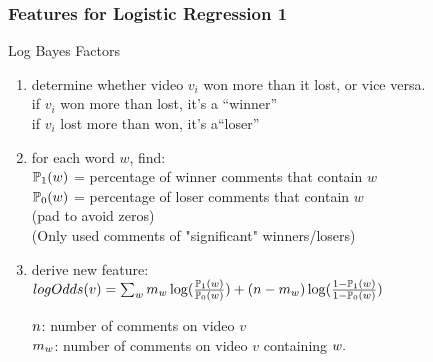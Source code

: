 \documentclass[fleqn]{beamer}
\begin{document}
\begin{frame}
\frametitle{Features for Logistic Regression 1}	
 

      \begin{beamerboxesrounded}{Log Bayes Factors}     
      \begin{enumerate}\vspace{2mm}
      \item determine whether video $v_i$ won more than it lost, or vice versa.\\
               if $v_i$ won more than lost, it's a ``winner''\\
               if $v_i$ lost more than won, it's a``loser''
               \vspace{2mm}
      \item for each word $w$, find: \\
              $\mathbb{P}_1(\mathnormal{w})$ 
             = percentage of winner comments that contain $w$\\
             $\mathbb{P}_0(\mathnormal{w})$ = 
               percentage of loser comments that contain $w$\\
               (pad to avoid zeros)\\
               (Only used comments of "significant" winners/losers)\vspace{2mm}
      \item derive new feature: \\      
$logOdds(v) =\sum_{\mathnormal{w}} \mathnormal{m_w}\log(\frac{\mathbb{P}_1(\mathnormal{w})}{\mathbb{P}_0(\mathnormal{w})}) + (\mathnormal{n-m_w})\log(\frac{1-\mathbb{P}_1(\mathnormal{w})}{1-\mathbb{P}_0(\mathnormal{w})})$\vspace{3mm}

$\mathnormal{n}$: number of comments on video $v$\\
$\mathnormal{m_w}$: number of comments on video $v$ containing $\mathnormal{w}.$  \vspace{3mm}
      \end{enumerate}
    \end{beamerboxesrounded}

\end{frame}
\end{document}
